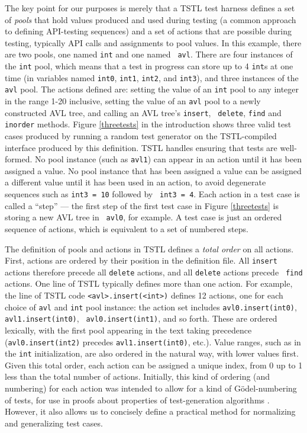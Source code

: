 The key point for our purposes is merely that a TSTL test harness
defines a set of \emph{pools} that hold values produced and used
during testing \cite{AndrewsTR} (a common approach to defining
API-testing sequences) and a set of actions that are possible during
testing, typically API calls and assignments to pool values.  In this
example, there are two pools, one named {\tt int} and one named {\tt
  avl}.  There are four instances of the {\tt int} pool, which means
that a test in progress can store up to 4 {\tt int}s at one time (in
variables named {\tt int0}, {\tt int1}, {\tt int2}, and {\tt int3}), and three
instances of the {\tt avl} pool.  The actions defined are: setting
the value of an {\tt int} pool to any integer in the range 1-20
inclusive, setting the value of an {\tt avl} pool to a newly
constructed AVL tree, and calling an AVL tree's {\tt insert}, {\tt
  delete}, {\tt find} and {\tt inorder} methods.  Figure
\ref{threetests} in the introduction shows three
valid test cases produced by running a random test generator on
the TSTL-compiled interface produced by this definition.  TSTL handles
ensuring that tests are well-formed. No pool instance
(such as {\tt avl1}) can appear in an action until it has been assigned
a value.  No pool instance that has been assigned a value can be
assigned a different value until it has been used in an action, to
avoid degenerate sequences such as {\tt int3 = 10} followed by {\tt
  int3 = 4}.  Each action in a test case is called a ``step'' --- the
first step of the first test case in Figure \ref{threetests} is storing a new AVL tree in {\tt
  avl0}, for example.  A test case is just an ordered sequence of
actions, which is equivalent to a set of numbered steps.

The definition of pools and actions in TSTL defines a \emph{total
  order} on all actions.  First, actions are ordered by their position
in the definition file.  All {\tt insert} actions therefore precede
all {\tt delete} actions, and all {\tt delete} actions precede {\tt
  find} actions.  One line of TSTL typically defines more than one action. For
example, the line of TSTL code {\tt <avl>.insert(<int>)} defines 12 actions, one
for each choice of {\tt avl} and {\tt int} pool instance:  the action set
includes {\tt avl0.insert(int0)}, {\tt avl1.insert(int0)}, {\tt
  avl0.insert(int1)}, and so forth.  These are
ordered lexically, with the first pool appearing in the text taking
precedence ({\tt avl0.insert(int2)} precedes {\tt avl1.insert(int0)},
etc.).  Value ranges, such as in the {\tt int} initialization, are also
ordered in the natural way, with lower values first.  Given this total
order, each action can be assigned a unique index, from 0 up to 1 less
than the total number of actions. Initially, this kind of ordering (and
numbering) for each action was intended to allow for a kind of
G\"odel-numbering of tests, for use in proofs about
properties of test-generation algorithms
\cite{AndrewsTR}.  However, it also allows us to concisely define a
practical method for normalizing and generalizing test cases.

